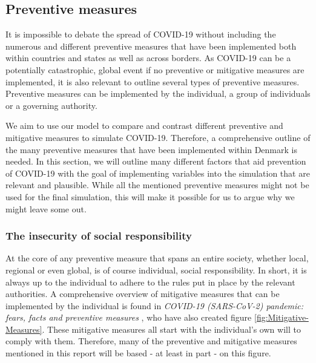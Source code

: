 \subsection{Preventive measures}
It is impossible to debate the spread of COVID-19 without including the numerous and different preventive measures that have been implemented both within countries and states as well as across borders. As COVID-19 can be a potentially catastrophic, global event if no preventive or mitigative measures are implemented, it is also relevant to outline several types of preventive measures. Preventive measures can be implemented by the individual, a group of individuals or a governing authority.

We aim to use our model to compare and contrast different preventive and mitigative measures to simulate COVID-19. Therefore, a comprehensive outline of the many preventive measures that have been implemented within Denmark is needed. In this section, we will outline many different factors that aid prevention of COVID-19 with the goal of implementing variables into the simulation that are relevant and plausible. While all the mentioned preventive measures might not be used for the final simulation, this will make it possible for us to argue why we might leave some out.


\subsubsection{The insecurity of social responsibility}

At the core of any preventive measure that spans an entire society, whether local, regional or even global, is of course individual, social responsibility. In short, it is always up to the individual to adhere to the rules put in place by the relevant authorities. A comprehensive overview of mitigative measures that can be implemented by the individual is found in \textit{COVID-19 (SARS-CoV-2) pandemic: fears, facts and preventive measures} \citep{ayenigbara_covid-19_2020}, who have also created figure \ref{fig:Mitigative-Measures}. These mitigative measures all start with the individual’s own will to comply with them. Therefore, many of the preventive and mitigative measures mentioned in this report will be based - at least in part - on this figure.

